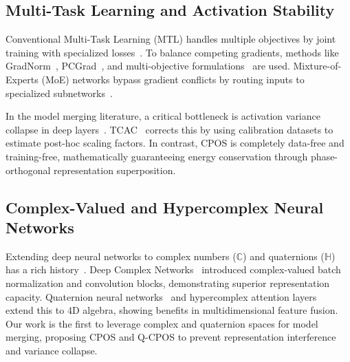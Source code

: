 \documentclass{article}
\theoremstyle{plain}
\theoremstyle{definition}
\theoremstyle{remark}
\begin{document}
\subsection{Multi-Task Learning and Activation Stability}
Conventional Multi-Task Learning (MTL) handles multiple objectives by joint training with specialized losses~\cite{caruana1997multitask,ruder2017overview}. To balance competing gradients, methods like GradNorm~\cite{chen2018gradnorm}, PCGrad~\cite{yu2020gradient}, and multi-objective formulations~\cite{sener2018multi,kendall2018multi} are used. Mixture-of-Experts (MoE) networks bypass gradient conflicts by routing inputs to specialized subnetworks~\cite{shazeer2017outrageously,fedus2021switch,ortiz2023task}.

In the model merging literature, a critical bottleneck is activation variance collapse in deep layers~\cite{tcac2025}. TCAC~\cite{tcac2025} corrects this by using calibration datasets to estimate post-hoc scaling factors. In contrast, CPOS is completely data-free and training-free, mathematically guaranteeing energy conservation through phase-orthogonal representation superposition.

\subsection{Complex-Valued and Hypercomplex Neural Networks}
Extending deep neural networks to complex numbers ($\mathbb{C}$) and quaternions ($\mathbb{H}$) has a rich history~\cite{clarke1990generalization,nitta1997complex,hirose2012complex,scardapane2020complex}. Deep Complex Networks~\cite{trabelsi2018deep} introduced complex-valued batch normalization and convolution blocks, demonstrating superior representation capacity. Quaternion neural networks~\cite{schwenk2000connectionist,gaudet2018deep,popa2021deep} and hypercomplex attention layers~\cite{parcollet2019quaternion,tay2020lightweight,vecchi2020quaternion} extend this to 4D algebra, showing benefits in multidimensional feature fusion. Our work is the first to leverage complex and quaternion spaces for model merging, proposing CPOS and Q-CPOS to prevent representation interference and variance collapse.
\end{document}
